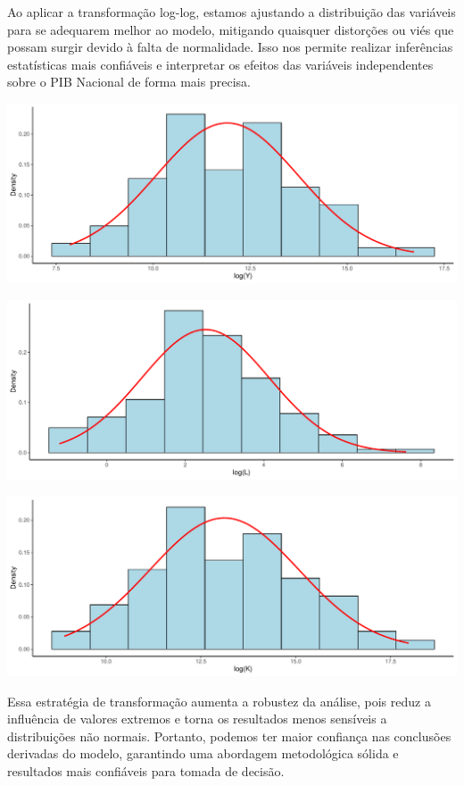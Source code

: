 \documentclass[
  letterpaper,
  DIV=11,
  numbers=noendperiod]{scrreprt}
\begin{document}
Ao aplicar a transformação log-log, estamos ajustando a distribuição das
variáveis para se adequarem melhor ao modelo, mitigando quaisquer
distorções ou viés que possam surgir devido à falta de normalidade. Isso
nos permite realizar inferências estatísticas mais confiáveis e
interpretar os efeitos das variáveis independentes sobre o PIB Nacional
de forma mais precisa.

\includegraphics{trabalho_files/figure-pdf/unnamed-chunk-9-1.pdf}

\includegraphics{trabalho_files/figure-pdf/unnamed-chunk-10-1.pdf}

\includegraphics{trabalho_files/figure-pdf/unnamed-chunk-11-1.pdf}

Essa estratégia de transformação aumenta a robustez da análise, pois
reduz a influência de valores extremos e torna os resultados menos
sensíveis a distribuições não normais. Portanto, podemos ter maior
confiança nas conclusões derivadas do modelo, garantindo uma abordagem
metodológica sólida e resultados mais confiáveis para tomada de decisão.
\end{document}
